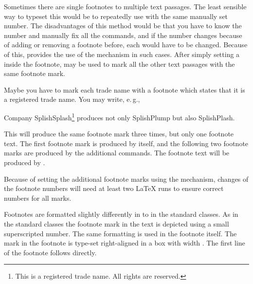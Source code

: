 \begin{Declaration}
\end{Declaration}
Sometimes there are single footnotes to
 multiple text passages. The least sensible way to typeset this would
be to repeatedly use  with the same manually set
number. The disadvantages of this method would be that you have to
know the number and manually fix all the 
commands, and if the number changes because of adding or removing a
footnote before, each  would have to be
changed. Because of this, \KOMAScript{} provides the use of the
 mechanism in
such cases. After simply setting a  inside the footnote,
 may be used to mark all the other text passages with
the same footnote mark.
\begin{Example}
  Maybe you have to mark each trade name with a footnote which states that it
  is a registered trade name. You may write, e.\,g.,
\begin{lstcode}
  Company SplishSplash\footnote{This is a registered trade name.
    All rights are reserved.\label{refnote}}
  produces not only SplishPlump
  but also SplishPlash.
\end{lstcode}
  This will produce the same footnote mark three times, but only one footnote
  text. The first footnote mark is produced by 
  itself, and the following two footnote marks are produced by
  the additional  commands. The footnote text will be produced by
  .  
\end{Example}
Because of setting the additional footnote marks using the 
mechanism, changes of the footnote numbers will need at least two \LaTeX{}
runs to ensure correct numbers for all  marks.%
%
\EndIndexGroup


\begin{Declaration}
\end{Declaration}%
Footnotes are formatted slightly differently in {\KOMAScript} to in the
standard classes. As in the standard classes the footnote mark in the text is
depicted using a small superscripted number. The same formatting is used in
the footnote itself. The mark in the footnote is type-set right-aligned in a
box with width . The first line of the footnote follows
directly.

